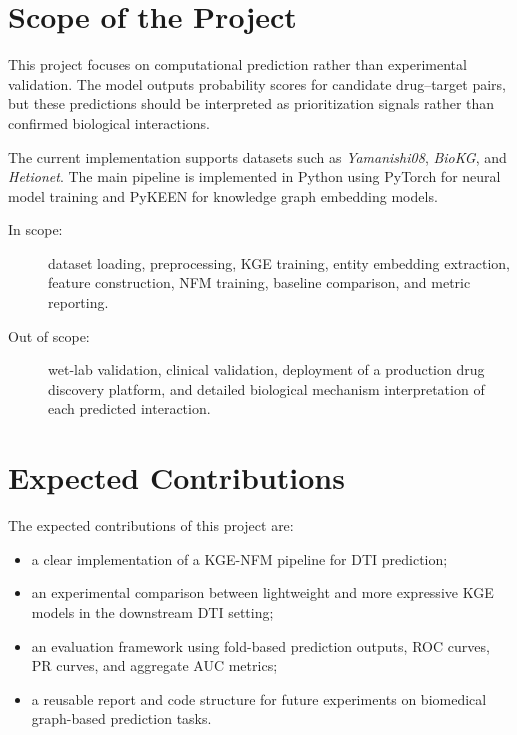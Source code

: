 \section{Scope of the Project}

This project focuses on computational prediction rather than experimental
validation. The model outputs probability scores for candidate drug--target
pairs, but these predictions should be interpreted as prioritization signals
rather than confirmed biological interactions.

The current implementation supports datasets such as \textit{Yamanishi08},
\textit{BioKG}, and \textit{Hetionet}. The main pipeline is implemented in
Python using PyTorch for neural model training and PyKEEN for knowledge graph
embedding models.

\begin{description}
    \item[In scope:] dataset loading, preprocessing, KGE training, entity
    embedding extraction, feature construction, NFM training, baseline
    comparison, and metric reporting.

    \item[Out of scope:] wet-lab validation, clinical validation, deployment of
    a production drug discovery platform, and detailed biological mechanism
    interpretation of each predicted interaction.
\end{description}

\section{Expected Contributions}

The expected contributions of this project are:

\begin{itemize}
    \item a clear implementation of a KGE-NFM pipeline for DTI prediction;

    \item an experimental comparison between lightweight and more expressive KGE
    models in the downstream DTI setting;

    \item an evaluation framework using fold-based prediction outputs, ROC
    curves, PR curves, and aggregate AUC metrics;

    \item a reusable report and code structure for future experiments on
    biomedical graph-based prediction tasks.
\end{itemize}

